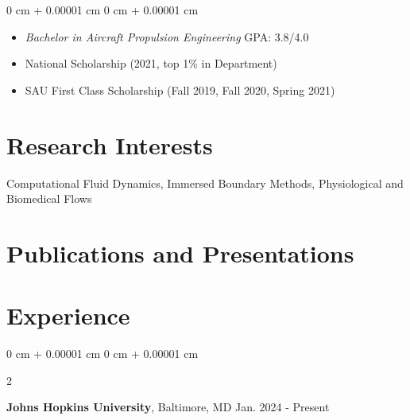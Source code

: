\documentclass[10pt, letterpaper]{article}
\newenvironment{highlights}{
    \begin{itemize}[
        topsep=0.10 cm,
        parsep=0.10 cm,
        partopsep=0pt,
        itemsep=0pt,
        leftmargin=0 cm + 10pt
    ]
}{
    \end{itemize}
} %
\newenvironment{onecolentry}{
    \begin{adjustwidth}{
        0 cm + 0.00001 cm
    }{
        0 cm + 0.00001 cm
    }
}{
    \end{adjustwidth}
} %
\newenvironment{twocolentry}[2][]{
    \onecolentry
    \def\secondColumn{#2}
    \setcolumnwidth{\fill, 4.5 cm}
    \begin{paracol}{2}
}{ 
    \switchcolumn \raggedleft \secondColumn
    \end{paracol}
    \endonecolentry
} %
\begin{document}
    \vspace{0.10 cm}
    \begin{onecolentry}
        \begin{highlights}

            \item \textsl{Bachelor in Aircraft Propulsion Engineering}
            \hfill{GPA: 3.8/4.0}

            \item National Scholarship (2021, top 1\% in Department)
            \item SAU First Class Scholarship (Fall 2019, Fall 2020, Spring 2021)
            
        \end{highlights}
    \end{onecolentry}


    \section{Research Interests}
    Computational Fluid Dynamics, Immersed Boundary Methods, Physiological and Biomedical Flows

    
    
    
    
    
    
    
    
    
    

    \vspace{0.2 cm}

    \section{Publications and Presentations}
    




    \section{Experience}

        \begin{twocolentry}{
        Jan. 2024 - Present
    }
        \textbf{Johns Hopkins University}, Baltimore, MD\end{twocolentry}
\end{document}
